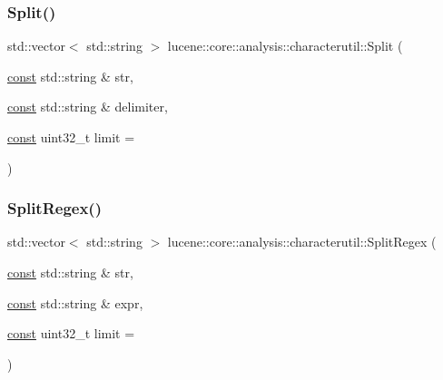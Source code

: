 \subsubsection{\texorpdfstring{Split()}{Split()}}
{\footnotesize\ttfamily std\+::vector$<$ std\+::string $>$ lucene\+::core\+::analysis\+::characterutil\+::\+Split (\begin{DoxyParamCaption}\item[{\mbox{\hyperlink{ZlibCrc32_8h_a2c212835823e3c54a8ab6d95c652660e}{const}} std\+::string \&}]{str,  }\item[{\mbox{\hyperlink{ZlibCrc32_8h_a2c212835823e3c54a8ab6d95c652660e}{const}} std\+::string \&}]{delimiter,  }\item[{\mbox{\hyperlink{ZlibCrc32_8h_a2c212835823e3c54a8ab6d95c652660e}{const}} uint32\+\_\+t}]{limit = {} }\end{DoxyParamCaption})}

\mbox{\label{namespacelucene_1_1core_1_1analysis_1_1characterutil_ab8a8fe2b305fad128673af6acf6ed291}} 
\subsubsection{\texorpdfstring{Split\+Regex()}{SplitRegex()}}
{\footnotesize\ttfamily std\+::vector$<$ std\+::string $>$ lucene\+::core\+::analysis\+::characterutil\+::\+Split\+Regex (\begin{DoxyParamCaption}\item[{\mbox{\hyperlink{ZlibCrc32_8h_a2c212835823e3c54a8ab6d95c652660e}{const}} std\+::string \&}]{str,  }\item[{\mbox{\hyperlink{ZlibCrc32_8h_a2c212835823e3c54a8ab6d95c652660e}{const}} std\+::string \&}]{expr,  }\item[{\mbox{\hyperlink{ZlibCrc32_8h_a2c212835823e3c54a8ab6d95c652660e}{const}} uint32\+\_\+t}]{limit = {} }\end{DoxyParamCaption})}

\mbox{\label{namespacelucene_1_1core_1_1analysis_1_1characterutil_a8970bd9664a398220515d53e97cb051c}} 
